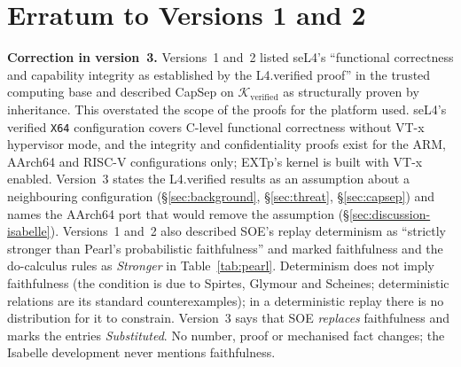 \documentclass[conference]{IEEEtran}
\newcommand{\Kverified}{\mathcal{K}_\text{verified}}
\begin{document}
\section{Erratum to Versions 1 and 2}\label{app:erratum}
\noindent\textbf{Correction in version~3.} Versions~1 and~2 listed seL4's
``functional correctness and capability integrity as established by
the L4.verified proof'' in the trusted computing base and described
CapSep on $\Kverified$ as structurally proven by inheritance. This
overstated the scope of the proofs for the platform used. seL4's
verified \texttt{X64} configuration covers C-level functional
correctness without VT-x hypervisor mode, and the integrity and
confidentiality proofs exist for the ARM, AArch64 and RISC-V
configurations only; EXTp's kernel is built with VT-x enabled.
Version~3 states the L4.verified results as an assumption about a
neighbouring configuration (\S\ref{sec:background},
\S\ref{sec:threat}, \S\ref{sec:capsep}) and names the AArch64 port
that would remove the assumption (\S\ref{sec:discussion-isabelle}).
Versions~1 and~2 also described SOE's replay determinism as
``strictly stronger than Pearl's probabilistic faithfulness'' and
marked faithfulness and the do-calculus rules as \emph{Stronger} in
Table~\ref{tab:pearl}. Determinism does not imply faithfulness (the
condition is due to Spirtes, Glymour and Scheines; deterministic
relations are its standard counterexamples); in a deterministic
replay there is no distribution for it to constrain. Version~3 says
that SOE \emph{replaces} faithfulness and marks the entries
\emph{Substituted}. No number, proof or mechanised fact changes;
the Isabelle development never mentions faithfulness.
\end{document}
